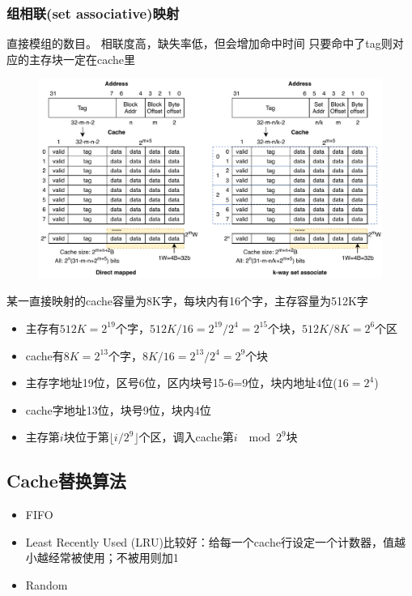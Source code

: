 \subsubsection{组相联(set associative)映射}
直接模组的数目。
相联度高，缺失率低，但会增加命中时间
只要命中了tag则对应的主存块一定在cache里
\begin{figure}[H]
\centering
\includegraphics[width=0.8\linewidth]{fig/Cache-combine.pdf}
\end{figure}

\begin{example}
某一直接映射的cache容量为8K字，每块内有16个字，主存容量为512K字
\end{example}
\begin{analysis}
\begin{itemize}
	\item 主存有$512K=2^{19}$个字，$512K/16=2^{19}/2^4=2^{15}$个块，$512K/8K=2^6$个区
	\item cache有$8K=2^{13}$个字，$8K/16=2^{13}/2^4=2^9$个块
	\item 主存字地址19位，区号6位，区内块号15-6=9位，块内地址4位($16=2^4$)
	\item cache字地址13位，块号9位，块内4位
	\item 主存第$i$块位于第$\lfloor i/2^9\rfloor$个区，调入cache第$i\;\mod 2^9$块
\end{itemize}
\end{analysis}


\subsection{Cache替换算法}
\begin{itemize}
	\item FIFO
	\item Least Recently Used (LRU)比较好：给每一个cache行设定一个计数器，值越小越经常被使用；不被用则加1
	\item Random
\end{itemize}

